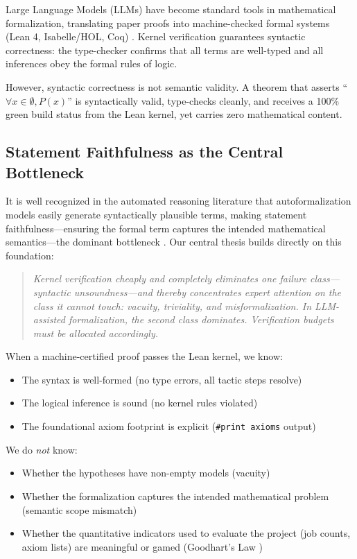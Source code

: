 \documentclass[11pt,a4paper]{article}
\theoremstyle{definition}
\theoremstyle{remark}
\begin{document}
Large Language Models (LLMs) have become standard tools in mathematical formalization, translating paper proofs into machine-checked formal systems (Lean 4, Isabelle/HOL, Coq) \cite{MouraUllrich2021}. Kernel verification guarantees syntactic correctness: the type-checker confirms that all terms are well-typed and all inferences obey the formal rules of logic.

However, syntactic correctness is not semantic validity. A theorem that asserts ``$\forall x \in \emptyset, P(x)$'' is syntactically valid, type-checks cleanly, and receives a 100\% green build status from the Lean kernel, yet carries zero mathematical content.

\subsection{Statement Faithfulness as the Central Bottleneck}

It is well recognized in the automated reasoning literature that autoformalization models easily generate syntactically plausible terms, making statement faithfulness---ensuring the formal term captures the intended mathematical semantics---the dominant bottleneck \cite{Zheng2021,Azerbayev2023,Buzzard2022}. Our central thesis builds directly on this foundation:
\begin{quote}
\emph{Kernel verification cheaply and completely eliminates one failure class---syntactic unsoundness---and thereby concentrates expert attention on the class it cannot touch: vacuity, triviality, and misformalization. In LLM-assisted formalization, the second class dominates. Verification budgets must be allocated accordingly.}
\end{quote}

When a machine-certified proof passes the Lean kernel, we know:
\begin{itemize}[leftmargin=2em]
  \item The syntax is well-formed (no type errors, all tactic steps resolve)
  \item The logical inference is sound (no kernel rules violated)
  \item The foundational axiom footprint is explicit (\texttt{\#print axioms} output)
\end{itemize}

We do \emph{not} know:
\begin{itemize}[leftmargin=2em]
  \item Whether the hypotheses have non-empty models (vacuity)
  \item Whether the formalization captures the intended mathematical problem (semantic scope mismatch)
  \item Whether the quantitative indicators used to evaluate the project (job counts, axiom lists) are meaningful or gamed (Goodhart's Law \cite{Goodhart1975,Strathern1997})
\end{itemize}
\end{document}
